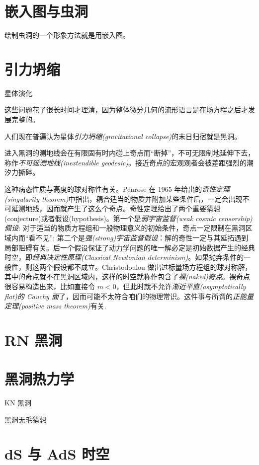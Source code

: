 \section{嵌入图与虫洞}
绘制虫洞的一个形象方法就是用嵌入图。


\section{引力坍缩}\label{sec:collapse}

星体演化

这些问题花了很长时间才理清，因为整体微分几何的流形语言是在场方程之后才发展完整的。

人们现在普遍认为星体\textit{引力坍缩(gravitational collapse)}的末日归宿就是黑洞。

进入黑洞的测地线会在有限固有时内碰上奇点而“断掉”，不可无限制地延伸下去，称作\textit{不可延测地线(inextendible geodesic)}。接近奇点的宏观观者会被差距强烈的潮汐力撕碎。

这种病态性质与高度的球对称性有关。Penrose 在 1965 年给出的\textit{奇性定理(singularity theorem)}中指出，耦合适当的物质并附加某些条件后，一定会出现不可延测地线，因而就产生了这么个奇点。奇性定理给出了两个重要猜想(conjecture)或者假设(hypothesis)。第一个是\textit{弱宇宙监督(weak cosmic censorship)假设}: 对于适当的物质方程组和一般物理意义的初始条件，奇点一定限制在黑洞区域内而“看不见”; 第二个是\textit{强(strong)宇宙监督假设}：解的奇性一定与其延拓遇到局部阻碍有关。后一个假设保证了动力学问题的唯一解必定是初始数据产生的经典时空，即\textit{经典决定性原理(Classical Newtonian determinism)}。如果抛弃条件的一般性，则这两个假设都不成立。Christodoulou 做出过标量场方程组的球对称解，其中的奇点就不在黑洞区域内，这样的时空就称作包含了\textit{裸(naked)奇点}。裸奇点很容易构造出来，比如直接令 $m<0$，但此时就不允许\textit{渐近平直(asymptotically flat)的 Cauchy 面}了，因而可能不太符合咱们的物理常识。这件事与所谓的\textit{正能量定理(positive mass theorem)}有关.


\section{RN 黑洞}

\section{黑洞热力学}

KN 黑洞

黑洞无毛猜想

\section{dS 与 AdS 时空}\label{sec:dS}



